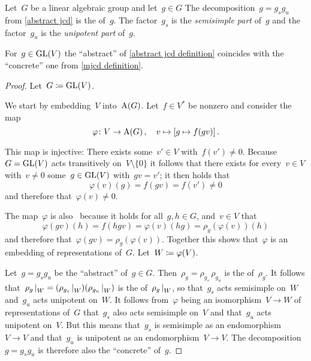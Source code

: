 \begin{definition}
  \label{abstract jcd definition}
  Let~$G$ be a linear algebraic group and let~$g \in G$
  The decomposition~$g = g_s g_u$ from \cref{abstract jcd} is the \emph{{\JCD}} of~$g$.
  The factor~$g_s$ is the \emph{semisimple part} of~$g$ and the factor~$g_u$ is the \emph{unipotent part} of~$g$.
\end{definition}


\begin{proposition}
  For~$g \in \operatorname{GL}(V)$ the \enquote{abstract} {\JCD} of \cref{abstract jcd definition} coincides with the \enquote{concrete} one from \cref{mjcd definition}.
\end{proposition}


\begin{proof}
  Let~$G \coloneqq \operatorname{GL}(V)$.
  
  We start by embedding~$V$ into~$\operatorname{A}(G)$.
  Let~$f \in V^*$ be nonzero and consider the~ map
  \[
            \varphi
    \colon  V
    \to     \operatorname{A}(G) \,,
    \quad   v
    \mapsto [g \mapsto f(gv)] \,.
  \]
  
  This map is injective:
  There exists some~$v' \in V$ with~$f(v') \neq 0$.
  Because~$G = \operatorname{GL}(V)$ acts transitively on~$V \setminus \{0\}$ it follows that there exists for every~$v \in V$ with~$v \neq 0$ some~$g \in \operatorname{GL}(V)$ with~$gv = v'$;
  it then holds that
  \[
          \varphi(v)(g)
    =     f(gv)
    =     f(v')
    \neq  0
  \]
  and therefore that~$\varphi(v) \neq 0$.

  The map~$\varphi$ is also~ because it holds for all~$g,h \in G$, and~$v \in V$ that
  \[
      \varphi(gv)(h)
    = f(hgv)
    = \varphi(v)(hg)
    =\rho_g(\varphi(v))(h)
  \]
  and therefore that~$\varphi(gv) = \rho_g(\varphi(v))$.      
  Together this shows that~$\varphi$ is an embedding of representations of~$G$.
  Let~$W \coloneqq \varphi(V)$.
    
  Let~$g = g_s g_u$ be the \enquote{abstract} {\JCD} of~$g \in G$.
  Then~$\rho_g = \rho_{g_s} \, \rho_{g_u}$ is the {\JCD} of~$\rho_g$.
  It follows that~$\restrict{\rho_g}{W} = (\restrict{\rho_{g_s}}{W}) (\restrict{\rho_{g_u}}{W})$ is the {\JCD} of~$\restrict{\rho_g}{W}$, so that~$g_s$ acts semisimple on~$W$ and~$g_u$ acts unipotent on~$W$.
  It follows from~$\varphi$ being an isomorphism~$V \to W$ of representations of~$G$ that~$g_s$ also acts semisimple on~$V$ and that~$g_u$ acts unipotent on~$V$.
  But this means that~$g_s$ is semisimple as an endomorphism~$V \to V$ and that~$g_u$ is unipotent as an endomorphism~$V \to V$.
  The decomposition~$g = g_s g_u$ is therefore also the \enquote{concrete} {\JCD} of~$g$.
\end{proof}


